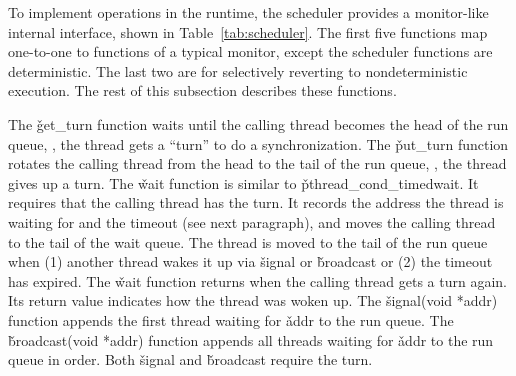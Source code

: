 \begin{table}[t]
\centering
\small
\begin{minipage}[t]{.25\textwidth}
\end{minipage}
\vspace{-.05in}
\caption{{\em Scheduler primitives.}} \label{tab:scheduler}
\vspace{-.05in}
\end{table}

To implement operations in the \parrot runtime, the scheduler provides a
monitor-like internal interface, shown in Table~\ref{tab:scheduler}.  The
first five functions map one-to-one to functions of a typical monitor,
except the scheduler functions are deterministic.  The last two are for
selectively reverting to nondeterministic execution.  The rest of this
subsection describes these functions.

The
\v{get\_turn} function waits until the calling thread becomes the head
of the run queue, \ie, the thread gets a ``turn'' to do a
synchronization.  The \v{put\_turn} function rotates the calling thread
from the head to the tail of the run queue, \ie, the thread gives up a
turn. The \v{wait} function is similar to
\v{pthread\_cond\_timedwait}.  It requires that the calling thread has the
turn.  It records the address the thread is waiting for and the timeout
(see next paragraph), and moves the calling thread to the tail
of the wait queue.  The thread is moved to the tail of the
run queue when (1) another thread wakes it up via \v{signal}
or \v{broadcast} or (2) the timeout has expired. The \v{wait}
function returns when the calling thread gets a turn again.  Its return
value indicates how the thread was woken up. The \v{signal(void *addr)}
function appends the first thread waiting for \v{addr} to the run queue.  The
\v{broadcast(void *addr)} function appends all threads waiting for
\v{addr} to the run queue in order.  Both \v{signal} and \v{broadcast} require
the turn.

